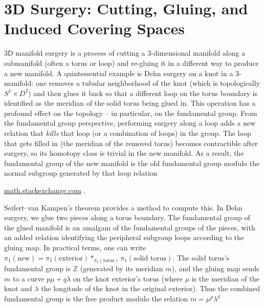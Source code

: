 \documentclass[11pt]{article}
\theoremstyle{remark}
\begin{document}
\section*{3D Surgery: Cutting, Gluing, and Induced Covering Spaces}
3D manifold surgery is a process of cutting a 3-dimensional manifold along a submanifold (often a torus or loop) and re-gluing it in a different way to produce a new manifold. A quintessential example is Dehn surgery on a knot in a 3-manifold: one removes a tubular neighborhood of the knot (which is topologically $S^1 \times D^2$) and then glues it back so that a different loop on the torus boundary is identified as the meridian of the solid torus being glued in. This operation has a profound effect on the topology – in particular, on the fundamental group. From the fundamental group perspective, performing surgery along a loop adds a new relation that \textit{kills} that loop (or a combination of loops) in the group. The loop that gets filled in (the meridian of the removed torus) becomes contractible after surgery, so its homotopy class is trivial in the new manifold. As a result, the fundamental group of the new manifold is the old fundamental group modulo the normal subgroup generated by that loop relation

\href{https://math.stackexchange.com/questions/2477228/fundamental-group-of-3-manifold-obtained-by-surgery-description#:~:text=The%20fundamental%20group%20of%20the,to%20the%20following%20additional%20relations}{math.stackexchange.com}
.

Seifert–van Kampen’s theorem provides a method to compute this. In Dehn surgery, we glue two pieces along a torus boundary. The fundamental group of the glued manifold is an amalgam of the fundamental groups of the pieces, with an added relation identifying the peripheral subgroup loops according to the gluing map. In practical terms, one can write $\pi_1(\text{new}) = \pi_1(\text{exterior}) *_{\pi_1(\text{torus})} \pi_1(\text{solid torus})$. The solid torus’s fundamental group is $\mathbb{Z}$ (generated by its meridian $m$), and the gluing map sends $m$ to a curve $p\mu + q\lambda$ on the knot exterior’s torus (where $\mu$ is the meridian of the knot and $\lambda$ the longitude of the knot in the original exterior). Thus the combined fundamental group is the free product modulo the relation $m = \mu^p\lambda^q$
\end{document}
